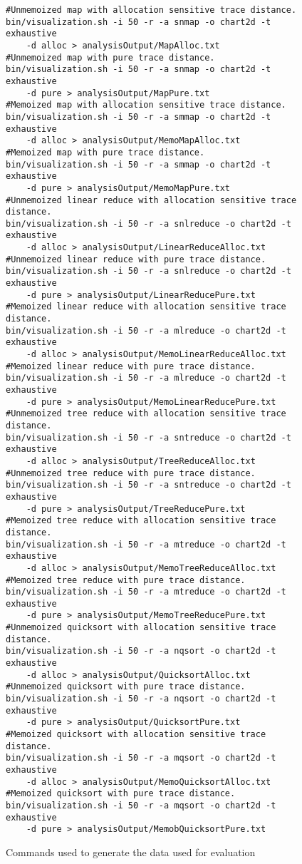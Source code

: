 \begin{figure}
\begin{lstlisting}[frame=single,basicstyle=\tiny]
#Unmemoized map with allocation sensitive trace distance. 
bin/visualization.sh -i 50 -r -a snmap -o chart2d -t exhaustive 
	-d alloc > analysisOutput/MapAlloc.txt
#Unmemoized map with pure trace distance. 
bin/visualization.sh -i 50 -r -a snmap -o chart2d -t exhaustive 
	-d pure > analysisOutput/MapPure.txt
#Memoized map with allocation sensitive trace distance. 
bin/visualization.sh -i 50 -r -a smmap -o chart2d -t exhaustive 
	-d alloc > analysisOutput/MemoMapAlloc.txt
#Memoized map with pure trace distance. 
bin/visualization.sh -i 50 -r -a smmap -o chart2d -t exhaustive 
	-d pure > analysisOutput/MemoMapPure.txt
#Unmemoized linear reduce with allocation sensitive trace distance. 
bin/visualization.sh -i 50 -r -a snlreduce -o chart2d -t exhaustive 
	-d alloc > analysisOutput/LinearReduceAlloc.txt
#Unmemoized linear reduce with pure trace distance. 
bin/visualization.sh -i 50 -r -a snlreduce -o chart2d -t exhaustive 
	-d pure > analysisOutput/LinearReducePure.txt
#Memoized linear reduce with allocation sensitive trace distance. 
bin/visualization.sh -i 50 -r -a mlreduce -o chart2d -t exhaustive 
	-d alloc > analysisOutput/MemoLinearReduceAlloc.txt
#Memoized linear reduce with pure trace distance. 
bin/visualization.sh -i 50 -r -a mlreduce -o chart2d -t exhaustive 
	-d pure > analysisOutput/MemoLinearReducePure.txt
#Unmemoized tree reduce with allocation sensitive trace distance. 
bin/visualization.sh -i 50 -r -a sntreduce -o chart2d -t exhaustive 
	-d alloc > analysisOutput/TreeReduceAlloc.txt
#Unmemoized tree reduce with pure trace distance. 
bin/visualization.sh -i 50 -r -a sntreduce -o chart2d -t exhaustive 
	-d pure > analysisOutput/TreeReducePure.txt
#Memoized tree reduce with allocation sensitive trace distance. 
bin/visualization.sh -i 50 -r -a mtreduce -o chart2d -t exhaustive 
	-d alloc > analysisOutput/MemoTreeReduceAlloc.txt
#Memoized tree reduce with pure trace distance. 
bin/visualization.sh -i 50 -r -a mtreduce -o chart2d -t exhaustive 
	-d pure > analysisOutput/MemoTreeReducePure.txt
#Unmemoized quicksort with allocation sensitive trace distance. 
bin/visualization.sh -i 50 -r -a nqsort -o chart2d -t exhaustive 
	-d alloc > analysisOutput/QuicksortAlloc.txt
#Unmemoized quicksort with pure trace distance. 
bin/visualization.sh -i 50 -r -a nqsort -o chart2d -t exhaustive 
	-d pure > analysisOutput/QuicksortPure.txt
#Memoized quicksort with allocation sensitive trace distance. 
bin/visualization.sh -i 50 -r -a mqsort -o chart2d -t exhaustive 
	-d alloc > analysisOutput/MemoQuicksortAlloc.txt
#Memoized quicksort with pure trace distance. 
bin/visualization.sh -i 50 -r -a mqsort -o chart2d -t exhaustive 
	-d pure > analysisOutput/MemobQuicksortPure.txt
\end{lstlisting}
\caption{Commands used to generate the data used for evaluation}
\label{code:eval_commands}
\end{figure}



